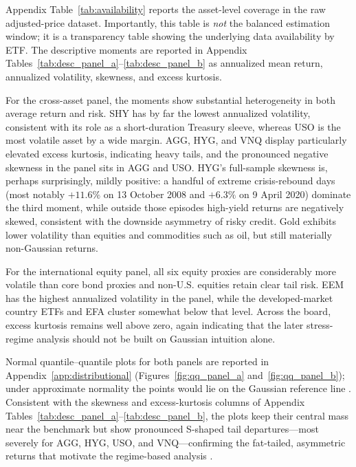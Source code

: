 Appendix Table~\ref{tab:availability} reports the asset-level coverage in the raw adjusted-price dataset. Importantly, this table is \emph{not} the balanced estimation window; it is a transparency table showing the underlying data availability by ETF. The descriptive moments are reported in Appendix Tables~\ref{tab:desc_panel_a}--\ref{tab:desc_panel_b} as annualized mean return, annualized volatility, skewness, and excess kurtosis.

For the cross-asset panel, the moments show substantial heterogeneity in both average return and risk. SHY has by far the lowest annualized volatility, consistent with its role as a short-duration Treasury sleeve, whereas USO is the most volatile asset by a wide margin. AGG, HYG, and VNQ display particularly elevated excess kurtosis, indicating heavy tails, and the pronounced negative skewness in the panel sits in AGG and USO. HYG's full-sample skewness is, perhaps surprisingly, mildly positive: a handful of extreme crisis-rebound days (most notably $+11.6\%$ on 13 October 2008 and $+6.3\%$ on 9 April 2020) dominate the third moment, while outside those episodes high-yield returns are negatively skewed, consistent with the downside asymmetry of risky credit. Gold exhibits lower volatility than equities and commodities such as oil, but still materially non-Gaussian returns.

For the international equity panel, all six equity proxies are considerably more volatile than core bond proxies and non-U.S. equities retain clear tail risk. EEM has the highest annualized volatility in the panel, while the developed-market country ETFs and EFA cluster somewhat below that level. Across the board, excess kurtosis remains well above zero, again indicating that the later stress-regime analysis should not be built on Gaussian intuition alone.

Normal quantile--quantile plots for both panels are reported in Appendix~\ref{app:distributional} (Figures~\ref{fig:qq_panel_a} and~\ref{fig:qq_panel_b}); under approximate normality the points would lie on the Gaussian reference line \citep{wilk1968probability}. Consistent with the skewness and excess-kurtosis columns of Appendix Tables~\ref{tab:desc_panel_a}--\ref{tab:desc_panel_b}, the plots keep their central mass near the benchmark but show pronounced S-shaped tail departures---most severely for AGG, HYG, USO, and VNQ---confirming the fat-tailed, asymmetric returns that motivate the regime-based analysis \citep{fama1965behavior,cont2001empirical}.

